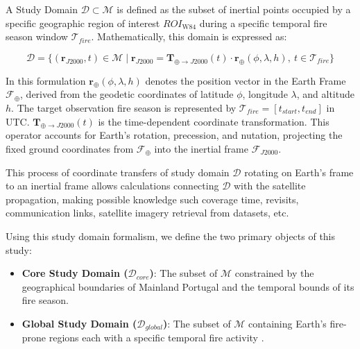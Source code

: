 A Study Domain $\mathcal{D} \subset \mathcal{M}$ is defined as the subset of inertial points occupied by a specific geographic region of interest $ROI_{\text{W84}}$ during a specific temporal fire season window $\mathcal{T}_{fire}$. Mathematically, this domain is expressed as:

\begin{equation}

    \mathcal{D} = \{ (\mathbf{r}_{J2000}, t) \in \mathcal{M} \mid \mathbf{r}_{J2000} = \mathbf{T}_{\oplus \to J2000}(t) \cdot \mathbf{r}_{\oplus}(\phi, \lambda, h), \ t \in \mathcal{T}_{fire} \}

\end{equation}

In this formulation  $\mathbf{r}_{\oplus}(\phi, \lambda, h)$ denotes the position vector in the Earth Frame $\mathcal{F}_{\oplus}$, derived from the geodetic coordinates of latitude $\phi$, longitude $\lambda$, and altitude $h$. The target observation fire season is represented by $\mathcal{T}_{fire} = [t_{start}, t_{end}]$ in UTC. $\mathbf{T}_{\oplus \to J2000}(t)$ is the time-dependent coordinate transformation. This operator accounts for Earth’s rotation, precession, and nutation, projecting the fixed ground coordinates from $\mathcal{F}_{\oplus}$ into the inertial frame $\mathcal{F}_{J2000}$.  



This process of coordinate transfers of study domain $\mathcal{D}$ rotating on Earth's frame to an inertial frame allows calculations connecting $\mathcal{D}$ with the satellite propagation, making possible knowledge such coverage time, revisits, communication links, satellite imagery retrieval from datasets, etc.



Using this study domain formalism, we define the two primary objects of this study:

\begin{itemize}

    \item \textbf{Core Study Domain ($\mathcal{D}_{core}$)}: The subset of $\mathcal{M}$ constrained by the geographical boundaries of Mainland Portugal and the temporal bounds of its fire season.

    \item \textbf{Global Study Domain ($\mathcal{D}_{global}$)}: The subset of  $\mathcal{M}$  containing Earth's fire-prone regions each with a specific temporal fire activity .

\end{itemize}



